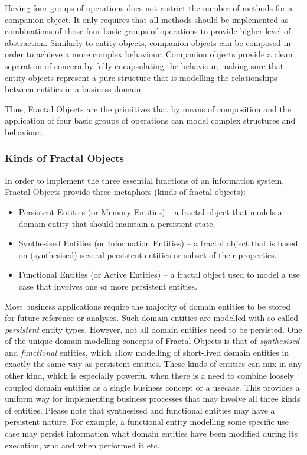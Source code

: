   Having four groups of operations does not restrict the number of methods for a companion object.
  It only requires that all methods should be implemented as combinations of those four basic groups of operations to provide higher level of abstraction.
  Similarly to entity objects, companion objects can be composed in order to achieve a more complex behaviour.
  Companion objects provide a clean separation of concern by fully encapsulating the behaviour, making sure that entity objects represent a pure structure that is modelling the relationships between entities in a business domain.

  Thus, Fractal Objects are the primitives that by means of composition and the application of four basic groups of operations can model complex structures and behaviour.
  
  \subsubsection{Kinds of Fractal Objects}

  In order to implement the three essential functions of an information system, Fractal Objects provide three metaphors (kinds of fractal objects):
  \begin{itemize}
    \item Persistent Entities (or Memory Entities) -- a fractal object that models a domain entity that should maintain a persistent state.
    \item Synthesised Entities (or Information Entities) -- a fractal object that is based on (synthesised) several persistent entities or subset of their properties.
    \item Functional Entities (or Active Entities) -- a fractal object used to model a use case that involves one or more persistent entities.
  \end{itemize}

  Most business applications require the majority of domain entities to be stored for future reference or analyses.
  Such domain entities are modelled with so-called \emph{persistent} entity types.
  However, not all domain entities need to be persisted.
  One of the unique domain modelling concepts of Fractal Objects is that of \emph{synthesised} and \emph{functional} entities, which allow modelling of short-lived domain entities in exactly the same way as persistent entities.
  These kinds of entities can mix in any other kind, which is especially powerful when there is a need to combine loosely coupled domain entities as a single business concept or a usecase.
  This provides a uniform way for implementing business processes that may involve all three kinds of entities.
  Please note that synthesised and functional entities may have a persistent nature.
  For example, a functional entity modelling some specific use case may persist information what domain entities have been modified during its execution, who and when performed it etc.

